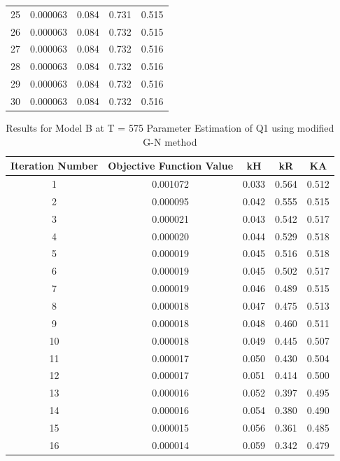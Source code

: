 \documentclass[a4paper,12pt]{article} %
\begin{document}
\begin{table}[ht]
\begin{tabular}{|c|c|c|c|c|}
        25 & 0.000063 & 0.084 & 0.731 & 0.515 \\
        26 & 0.000063 & 0.084 & 0.732 & 0.515 \\
        27 & 0.000063 & 0.084 & 0.732 & 0.516 \\
        28 & 0.000063 & 0.084 & 0.732 & 0.516 \\
        29 & 0.000063 & 0.084 & 0.732 & 0.516 \\
        30 & 0.000063 & 0.084 & 0.732 & 0.516 \\
        \hline
    \end{tabular}
    \end{table}
    
    \begin{table}[ht]
        \caption{Results for Model B at T = 575 Parameter Estimation of Q1 using modified G-N method}
        \centering
        \begin{tabular}{|c|c|c|c|c|}
            \hline
            Iteration Number & Objective Function Value & kH & kR & KA \\
            \hline   
            1 & 0.001072 & 0.033 & 0.564 & 0.512 \\
            2 & 0.000095 & 0.042 & 0.555 & 0.515 \\
            3 & 0.000021 & 0.043 & 0.542 & 0.517 \\
            4 & 0.000020 & 0.044 & 0.529 & 0.518 \\
            5 & 0.000019 & 0.045 & 0.516 & 0.518 \\
            6 & 0.000019 & 0.045 & 0.502 & 0.517 \\
            7 & 0.000019 & 0.046 & 0.489 & 0.515 \\
            8 & 0.000018 & 0.047 & 0.475 & 0.513 \\
            9 & 0.000018 & 0.048 & 0.460 & 0.511 \\
            10 & 0.000018 & 0.049 & 0.445 & 0.507 \\
            11 & 0.000017 & 0.050 & 0.430 & 0.504 \\
            12 & 0.000017 & 0.051 & 0.414 & 0.500 \\
            13 & 0.000016 & 0.052 & 0.397 & 0.495 \\
            14 & 0.000016 & 0.054 & 0.380 & 0.490 \\
            15 & 0.000015 & 0.056 & 0.361 & 0.485 \\
            16 & 0.000014 & 0.059 & 0.342 & 0.479 \\

\end{tabular}
\end{table}
\end{document}
